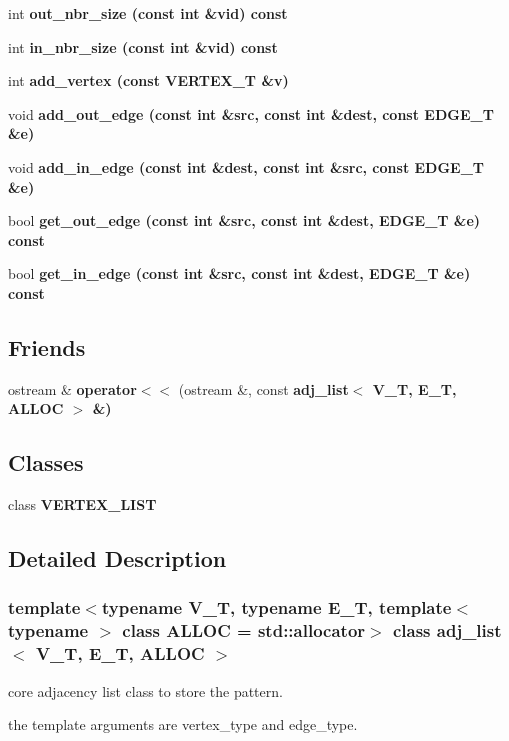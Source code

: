 \begin{CompactItemize}
\item 
int \bf{out\_\-nbr\_\-size} (const int \&vid) const 
\item 
int \bf{in\_\-nbr\_\-size} (const int \&vid) const 
\item 
int \bf{add\_\-vertex} (const VERTEX\_\-T \&v)
\item 
void \bf{add\_\-out\_\-edge} (const int \&src, const int \&dest, const EDGE\_\-T \&e)
\item 
void \bf{add\_\-in\_\-edge} (const int \&dest, const int \&src, const EDGE\_\-T \&e)
\item 
bool \bf{get\_\-out\_\-edge} (const int \&src, const int \&dest, EDGE\_\-T \&e) const 
\item 
bool \bf{get\_\-in\_\-edge} (const int \&src, const int \&dest, EDGE\_\-T \&e) const 
\end{CompactItemize}
\subsection*{Friends}
\begin{CompactItemize}
\item 
ostream \& \textbf{operator$<$$<$} (ostream \&, const \bf{adj\_\-list}$<$ V\_\-T, E\_\-T, ALLOC $>$ \&)\label{classadj__list_ca042b26a937398a6750de56b63b4c9f}

\end{CompactItemize}
\subsection*{Classes}
\begin{CompactItemize}
\item 
class \textbf{VERTEX\_\-LIST}
\end{CompactItemize}


\subsection{Detailed Description}
\subsubsection*{template$<$typename V\_\-T, typename E\_\-T, template$<$ typename $>$ class ALLOC = std::allocator$>$ class adj\_\-list$<$ V\_\-T, E\_\-T, ALLOC $>$}

core adjacency list class to store the pattern. 

the template arguments are vertex\_\-type and edge\_\-type. 



